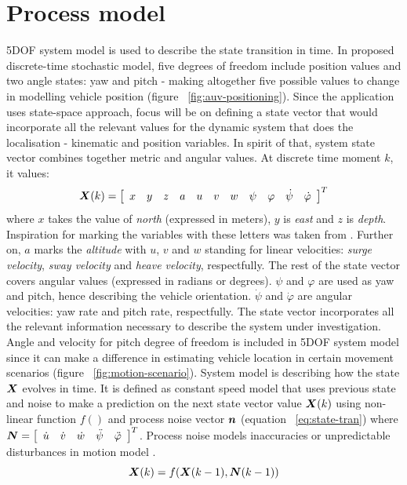 \section{Process model} \label{sec:system-model}
5DOF system model is used to describe the state transition in time. In proposed discrete-time stochastic model, five degrees of freedom include position values and two angle states: yaw and pitch - making altogether five possible values to change in modelling vehicle position (figure ~\ref{fig:auv-positioning}). Since the application uses state-space approach, focus will be on defining a state vector that would incorporate all the relevant values for the dynamic system that does the localisation - kinematic and position variables. In spirit of that, system state vector combines together metric and angular values. At discrete time moment $k$, it values:
$$ \boldsymbol{X}(k) = 
\left[ 
\begin{array}{ccccccccccc}
x & y & z & a & u & v & w & \psi & \varphi & \dot{\psi} & \dot{\varphi}
\end{array}
\right] ^{T} $$  
where $x$ takes the value of \textit{north} (expressed in meters), $y$ is \textit{east} and $z$ is \textit{depth}. Inspiration for marking the variables with these letters was taken from \cite{ribas10}. Further on, $a$ marks the \textit{altitude} with $u$, $v$ and $w$ standing for linear velocities: \textit{surge velocity}, \textit{sway velocity} and \textit{heave velocity}, respectfully. The rest of the state vector covers angular values (expressed in radians or degrees). $\psi$ and $\varphi$ are used as yaw and pitch, hence describing the vehicle orientation. $\dot{\psi}$ and $\dot{\varphi}$ are angular velocities: yaw rate and pitch rate, respectfully. The state vector incorporates all the relevant information necessary to describe the system under investigation. Angle and velocity for pitch degree of freedom is included in 5DOF system model since it can make a difference in estimating vehicle location in certain movement scenarios (figure ~\ref{fig:motion-scenario}). System model is describing how the state $\boldsymbol{X}$ evolves in time. It is defined as constant speed model that uses previous state and noise to make a prediction on the next state vector value $\boldsymbol{X}(k)$  using non-linear function $f()$ and process noise vector $\boldsymbol{n}$ (equation ~\ref{eq:state-tran}) where $\boldsymbol{N} = \left[ \begin{array}{ccccc} \dot{u} & \dot{v} & \dot{w} & \ddot{\psi} & \ddot{\varphi} \end{array} \right]^{T}$. Process noise models inaccuracies or unpredictable disturbances in motion model \cite{ristic04}. 
\begin{equation}
\boldsymbol{X}(k) = f(\boldsymbol{X}(k-1), \boldsymbol{N}(k-1))
\label{eq:state-tran}
\end{equation}

